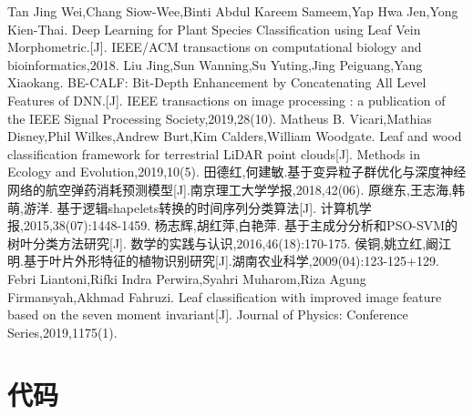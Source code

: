 \documentclass{whutmod}
\begin{document}
    
	\newpage	%
	\nocite{*}		%
%
%	
\begin{thebibliography}{9}%
	 Tan Jing Wei,Chang Siow-Wee,Binti Abdul Kareem Sameem,Yap Hwa Jen,Yong Kien-Thai. Deep Learning for Plant Species Classification using Leaf Vein Morphometric.[J]. IEEE/ACM transactions on computational biology and bioinformatics,2018.
	Liu Jing,Sun Wanning,Su Yuting,Jing Peiguang,Yang Xiaokang. BE-CALF: Bit-Depth Enhancement by Concatenating All Level Features of DNN.[J]. IEEE transactions on image processing : a publication of the IEEE Signal Processing Society,2019,28(10).
	Matheus B. Vicari,Mathias Disney,Phil Wilkes,Andrew Burt,Kim Calders,William Woodgate. Leaf and wood classification framework for terrestrial LiDAR point clouds[J]. Methods in Ecology and Evolution,2019,10(5).
	田德红,何建敏.基于变异粒子群优化与深度神经网络的航空弹药消耗预测模型[J].南京理工大学学报,2018,42(06).
	原继东,王志海,韩萌,游洋. 基于逻辑shapelets转换的时间序列分类算法[J]. 计算机学报,2015,38(07):1448-1459.
	杨志辉,胡红萍,白艳萍. 基于主成分分析和PSO-SVM的树叶分类方法研究[J]. 数学的实践与认识,2016,46(18):170-175.
	侯铜,姚立红,阚江明.基于叶片外形特征的植物识别研究[J].湖南农业科学,2009(04):123-125+129.
	Febri Liantoni,Rifki Indra Perwira,Syahri Muharom,Riza Agung Firmansyah,Akhmad Fahruzi. Leaf classification with improved image feature based on the seven moment invariant[J]. Journal of Physics: Conference Series,2019,1175(1).
\end{thebibliography}

	\newpage
	\appendix %

\section{代码}
\end{document}
